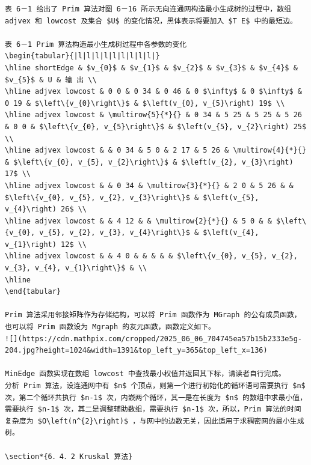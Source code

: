 \documentclass[10pt]{article}
\begin{document}
\begin{verbatim}
表 6－1 给出了 Prim 算法对图 6－16 所示无向连通网构造最小生成树的过程中，数组 adjvex 和 lowcost 及集合 $U$ 的变化情况，黑体表示将要加入 $T E$ 中的最短边。

表 6－1 Prim 算法构造最小生成树过程中各参数的变化
\begin{tabular}{|l|l|l|l|l|l|l|l|l|}
\hline shortEdge & $v_{0}$ & $v_{1}$ & $v_{2}$ & $v_{3}$ & $v_{4}$ & $v_{5}$ & U & 输 出 \\
\hline adjvex lowcost & 0 0 & 0 34 & 0 46 & 0 $\infty$ & 0 $\infty$ & 0 19 & $\left\{v_{0}\right\}$ & $\left(v_{0}, v_{5}\right) 19$ \\
\hline adjvex lowcost & \multirow{5}{*}{} & 0 34 & 5 25 & 5 25 & 5 26 & 0 0 & $\left\{v_{0}, v_{5}\right\}$ & $\left(v_{5}, v_{2}\right) 25$ \\
\hline adjvex lowcost & & 0 34 & 5 0 & 2 17 & 5 26 & \multirow{4}{*}{} & $\left\{v_{0}, v_{5}, v_{2}\right\}$ & $\left(v_{2}, v_{3}\right) 17$ \\
\hline adjvex lowcost & & 0 34 & \multirow{3}{*}{} & 2 0 & 5 26 & & $\left\{v_{0}, v_{5}, v_{2}, v_{3}\right\}$ & $\left(v_{5}, v_{4}\right) 26$ \\
\hline adjvex lowcost & & 4 12 & & \multirow{2}{*}{} & 5 0 & & $\left\{v_{0}, v_{5}, v_{2}, v_{3}, v_{4}\right\}$ & $\left(v_{4}, v_{1}\right) 12$ \\
\hline adjvex lowcost & & 4 0 & & & & & $\left\{v_{0}, v_{5}, v_{2}, v_{3}, v_{4}, v_{1}\right\}$ & \\
\hline
\end{tabular}

Prim 算法采用邻接矩阵作为存储结构，可以将 Prim 函数作为 MGraph 的公有成员函数，也可以将 Prim 函数设为 Mgraph 的友元函数，函数定义如下。
![](https://cdn.mathpix.com/cropped/2025_06_06_704745ea57b15b2333e5g-204.jpg?height=1024&width=1391&top_left_y=365&top_left_x=136)

MinEdge 函数实现在数组 lowcost 中查找最小权值并返回其下标，请读者自行完成。
分析 Prim 算法，设连通网中有 $n$ 个顶点，则第一个进行初始化的循环语可需要执行 $n$ 次，第二个循环共执行 $n-1$ 次，内嵌两个循环，其一是在长度为 $n$ 的数组中求最小值，需要执行 $n-1$ 次，其二是调整辅助数组，需要执行 $n-1$ 次，所以，Prim 算法的时间复杂度为 $O\left(n^{2}\right)$ ，与网中的边数无关，因此适用于求稠密网的最小生成树。

\section*{6．4．2 Kruskal 算法}


\end{verbatim}
\end{document}
